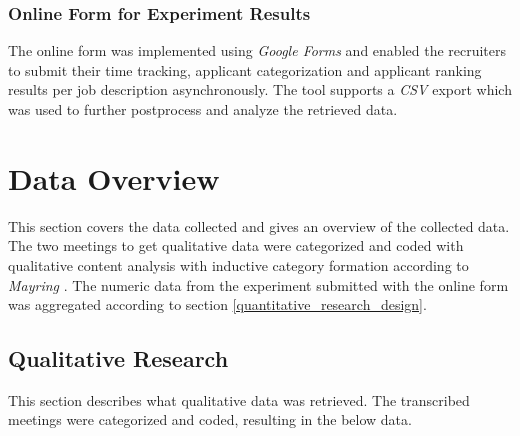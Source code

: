 \documentclass[draft,final]{thesisclass} %
\begin{document}
\subsubsection{Online Form for Experiment Results}
The online form was implemented using \textit{Google Forms} and enabled the recruiters to submit their time tracking, applicant categorization and applicant ranking results per job description asynchronously. The tool supports a \textit{CSV} export which was used to further postprocess and analyze the retrieved data.

\section{Data Overview}
This section covers the data collected and gives an overview of the collected data.
The two meetings to get qualitative data were categorized and coded with qualitative content analysis with inductive category formation according to \textit{Mayring} \parencite{mayring}.
The numeric data from the experiment submitted with the online form was aggregated according to section \ref{quantitative_research_design}.

\subsection{Qualitative Research}
This section describes what qualitative data was retrieved.
The transcribed meetings were categorized and coded, resulting in the below data.
\end{document}
